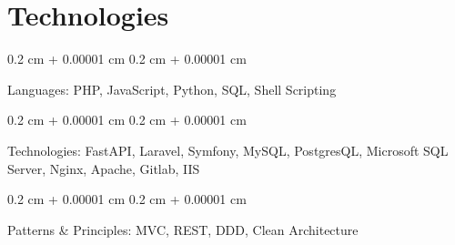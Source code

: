 \documentclass[10pt, letterpaper]{article}
\newenvironment{onecolentry}{
    \begin{adjustwidth}{
        0.2 cm + 0.00001 cm
    }{
        0.2 cm + 0.00001 cm
    }
}{
    \end{adjustwidth}
} %
\begin{document}
        
    
    \section{Technologies}


        
        \begin{onecolentry}
                Languages: PHP, JavaScript, Python, SQL, Shell Scripting
        \end{onecolentry}
            
                \vspace{0.2 cm}
            
        
        \begin{onecolentry}
                Technologies: FastAPI, Laravel, Symfony, MySQL, PostgresQL, Microsoft SQL Server, Nginx, Apache, Gitlab, IIS
        \end{onecolentry}
            
                \vspace{0.2 cm}
            
        
        \begin{onecolentry}
                Patterns \& Principles: MVC, REST, DDD, Clean Architecture
        \end{onecolentry}
            
        
    
\end{document}
